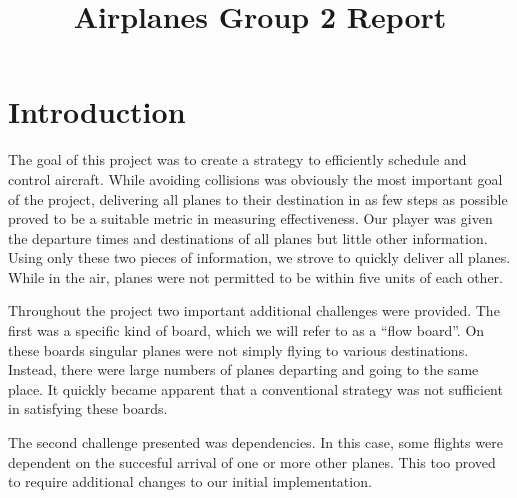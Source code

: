 \documentclass[10pt]{article}
\title{Airplanes Group 2 Report}
\author{\myname}
\begin{document}
\pagestyle{empty}
\maketitle

\newpage
\pagestyle{fancy}
\setlength\headheight{60pt}
\setcounter{tocdepth}{3}
\tableofcontents

\newpage
\section{Introduction}

The goal of this project was to create a strategy to efficiently schedule and control aircraft. While avoiding collisions was obviously the most important goal of the project, delivering all planes to their destination in as few steps as possible proved to be a suitable metric in measuring effectiveness. Our player was given the departure times and destinations of all planes but little other information. Using only these two pieces of information, we strove to quickly deliver all planes. While in the air, planes were not permitted to be within five units of each other.

Throughout the project two important additional challenges were provided. The first was a specific kind of board, which we will refer to as a ``flow board''. On these boards singular planes were not simply flying to various destinations. Instead, there were large numbers of planes departing and going to the same place. It quickly became apparent that a conventional strategy was not sufficient in satisfying these boards.

The second challenge presented was dependencies. In this case, some flights were dependent on the succesful arrival of one or more other planes. This too proved to require additional changes to our initial implementation.

\newpage
\end{document}
